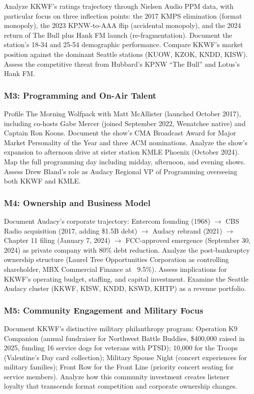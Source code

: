 \documentclass[11pt,letterpaper]{article}
\begin{document}
Analyze KKWF's ratings trajectory through Nielsen Audio PPM data, with particular focus on three inflection points: the 2017 KMPS elimination (format monopoly), the 2023 KPNW-to-AAA flip (accidental monopoly), and the 2024 return of The Bull plus Hank FM launch (re-fragmentation). Document the station's 18-34 and 25-54 demographic performance. Compare KKWF's market position against the dominant Seattle stations (KUOW, KZOK, KNDD, KISW). Assess the competitive threat from Hubbard's KPNW ``The Bull'' and Lotus's Hank FM.

\subsubsection{M3: Programming and On-Air Talent}

Profile The Morning Wolfpack with Matt McAllister (launched October 2017), including co-hosts Gabe Mercer (joined September 2022, Wenatchee native) and Captain Ron Koons. Document the show's CMA Broadcast Award for Major Market Personality of the Year and three ACM nominations. Analyze the show's expansion to afternoon drive at sister station KMLE Phoenix (October 2024). Map the full programming day including midday, afternoon, and evening shows. Assess Drew Bland's role as Audacy Regional VP of Programming overseeing both KKWF and KMLE.

\subsubsection{M4: Ownership and Business Model}

Document Audacy's corporate trajectory: Entercom founding (1968) $\rightarrow$ CBS Radio acquisition (2017, adding \$1.5B debt) $\rightarrow$ Audacy rebrand (2021) $\rightarrow$ Chapter 11 filing (January 7, 2024) $\rightarrow$ FCC-approved emergence (September 30, 2024) as private company with 80\% debt reduction. Analyze the post-bankruptcy ownership structure (Laurel Tree Opportunities Corporation as controlling shareholder, MBX Commercial Finance at ~9.5\%). Assess implications for KKWF's operating budget, staffing, and capital investment. Examine the Seattle Audacy cluster (KKWF, KISW, KNDD, KSWD, KHTP) as a revenue portfolio.

\subsubsection{M5: Community Engagement and Military Focus}

Document KKWF's distinctive military philanthropy program: Operation K9 Companion (annual fundraiser for Northwest Battle Buddies, \$400,000 raised in 2025, funding 16 service dogs for veterans with PTSD); 10,000 for the Troops (Valentine's Day card collection); Military Spouse Night (concert experiences for military families); Front Row for the Front Line (priority concert seating for service members). Analyze how this community investment creates listener loyalty that transcends format competition and corporate ownership changes.
\end{document}
